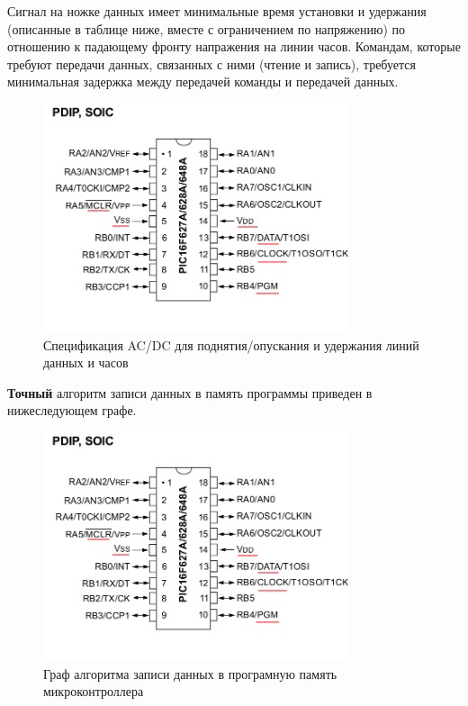 Сигнал на ножке данных имеет минимальные время установки и удержания 
(описанные в таблице ниже, вместе с ограничением по напряжению) по
отношению к падающему фронту напражения на линии часов. Командам, которые
требуют передачи данных, связанных с ними (чтение и запись),
требуется минимальная задержка между передачей команды и передачей данных.

\begin{figure}[h!]
    \centering
    \includegraphics[width=0.8\textwidth]{2017-05-07_at_22:31:52_screenshot.png}
    \caption{Спецификация AC/DC для поднятия/опускания и удержания линий данных и часов}
\end{figure}


\textbf{Точный} алгоритм записи данных в память программы приведен в нижеследующем графе.

\begin{figure}[h!]
    \centering
    \includegraphics[width=0.8\textwidth]{2017-05-07_at_22:31:52_screenshot.png}
    \caption{Граф алгоритма записи данных в програмную память микроконтроллера}
\end{figure}

